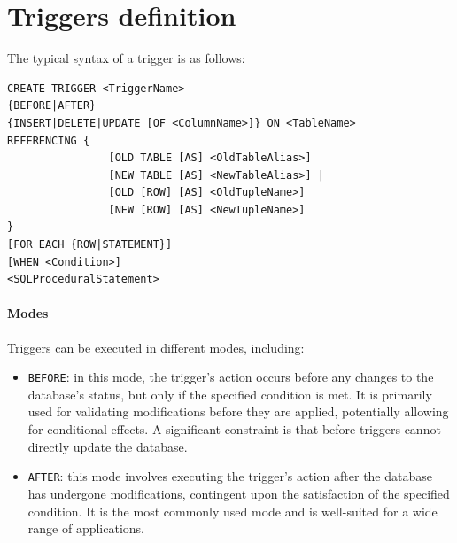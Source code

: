 \section{Triggers definition}

The typical syntax of a trigger is as follows:
\begin{lstlisting}[style=SQL]
CREATE TRIGGER <TriggerName>
{BEFORE|AFTER}
{INSERT|DELETE|UPDATE [OF <ColumnName>]} ON <TableName>
REFERENCING { 
                [OLD TABLE [AS] <OldTableAlias>]
                [NEW TABLE [AS] <NewTableAlias>] |
                [OLD [ROW] [AS] <OldTupleName>]
                [NEW [ROW] [AS] <NewTupleName>]
}
[FOR EACH {ROW|STATEMENT}]
[WHEN <Condition>]
<SQLProceduralStatement> 
\end{lstlisting}

\paragraph*{Modes}
Triggers can be executed in different modes, including:
\begin{itemize}
    \item \texttt{BEFORE}: in this mode, the trigger's action occurs before any changes to the database's status, but only if the specified condition is met.
        It is primarily used for validating modifications before they are applied, potentially allowing for conditional effects.
        A significant constraint is that before triggers cannot directly update the database. 
    \item \texttt{AFTER}: this mode involves executing the trigger's action after the database has undergone modifications, contingent upon the satisfaction of the specified condition.
        It is the most commonly used mode and is well-suited for a wide range of applications.
\end{itemize}

